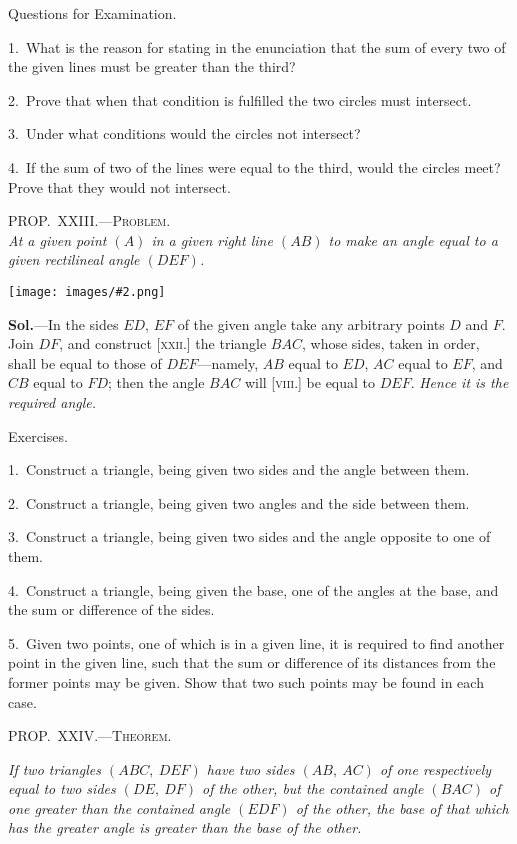 \documentclass[oneside]{book}
\newcommand\myprop[2]{
\bigskip\Needspace*{4\baselineskip}\begin{center}\textsc{#1}\\\medskip\emph{#2}\par\end{center}
}
\newcommand\mypropl[2]{
\bigskip\Needspace*{4\baselineskip}\begin{center}\textsc{#1}\end{center}
\hspace{\parindent}\emph{#2}\par\medskip
}
\newcommand\exhead[1]{
\Needspace*{5\baselineskip}\begin{center}
\textsf{#1}
\end{center}
}
\newcommand\imgcent[2]{
\begin{center}
\texttt{[image: images/\#2.png]}
\end{center}
}
\begin{document}
\exhead{Questions for Examination.}

\begin{footnotesize}
1.~What is the reason for stating in the enunciation that the
sum of every two of the given lines must be greater than the
third?

2.~Prove that when that condition is fulfilled the two circles
must intersect.

3.~Under what conditions would the circles not intersect?

4.~If the sum of two of the lines were equal to the third, would
the circles meet? Prove that they would not intersect.
\par\end{footnotesize}


\myprop{PROP\@.~XXIII\@.---Problem.}{At a given point $(A)$ in a given right line $(AB)$ to make
an angle equal to a given rectilineal angle $(DEF)$.}

\imgcent{270}{f040}

\textbf{Sol.}---In the sides $ED$, $EF$ of the given angle take
any arbitrary points $D$ and $F$. Join $DF$, and construct
[\textsc{xxii}.] the triangle $BAC$, whose sides, taken in order,
shall be equal to those of $DEF$---namely, $AB$ equal to
$ED$, $AC$ equal to $EF$, and $CB$ equal to $FD$; then the
angle $BAC$ will [\textsc{viii}.] be equal to $DEF$. \textit{Hence it is
the required angle.}


\exhead{Exercises.}

\begin{footnotesize}
1.~Construct a triangle, being given two sides and the angle
between them.

2.~Construct a triangle, being given two angles and the side
between them.

3.~Construct a triangle, being given two sides and the angle
opposite to one of them.

4.~Construct a triangle, being given the base, one of the angles
at the base, and the sum or difference of the sides.

5.~Given two points, one of which is in a given line, it is required
to find another point in the given line, such that the sum
or difference of its distances from the former points may be given.
Show that two such points may be found in each case.
\par\end{footnotesize}


\mypropl{PROP\@.~XXIV\@.---Theorem.}{If two triangles $(ABC,\ DEF)$ have two sides $(AB,\ AC)$
of one respectively equal to two sides $(DE,\ DF)$ of the
other, but the contained angle $(BAC)$ of one greater than
the contained angle $(EDF)$ of the other, the base of that
which has the greater angle is greater than the base of the
other.}
\end{document}
